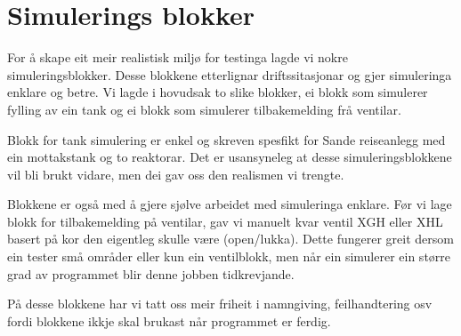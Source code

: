 \section{Simulerings blokker}
\thispagestyle{fancy}


For å skape eit meir realistisk miljø for testinga lagde vi nokre simuleringsblokker.
Desse blokkene etterlignar driftssitasjonar og gjer simuleringa enklare og betre.
Vi lagde i hovudsak to slike blokker, ei blokk som simulerer fylling av ein tank
og ei blokk som simulerer tilbakemelding frå ventilar.

Blokk for tank simulering er enkel og skreven spesfikt for Sande reiseanlegg med ein mottakstank
og to reaktorar.
Det er usansyneleg at desse simuleringsblokkene vil bli brukt vidare, men dei gav
oss den realismen vi trengte.

Blokkene er også med å gjere sjølve arbeidet med simuleringa enklare.
Før vi lage blokk for tilbakemelding på ventilar, 
gav vi manuelt kvar ventil XGH eller XHL basert på kor den eigentleg skulle være (open/lukka).
Dette fungerer greit dersom ein tester små områder eller kun ein ventilblokk, men
når ein simulerer ein større grad av programmet blir denne jobben tidkrevjande.

På desse blokkene har vi tatt oss meir friheit i namngiving, feilhandtering osv
fordi blokkene ikkje skal brukast når programmet er ferdig.

